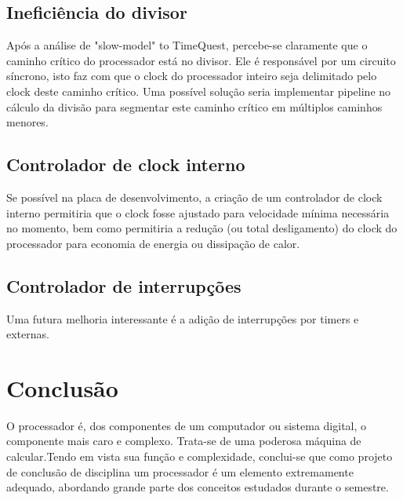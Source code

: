 \documentclass[11pt]{report}
\begin{document}
\section*{Ineficiência do divisor}
Após a análise de "slow-model" to TimeQuest, percebe-se claramente que o caminho crítico do processador está no divisor. Ele é responsável por um circuito síncrono, isto faz com que o clock do processador inteiro seja delimitado pelo clock deste caminho crítico. Uma possível solução seria implementar pipeline no cálculo da divisão para segmentar este caminho crítico em múltiplos caminhos menores.

\section*{Controlador de clock interno}
Se possível na placa de desenvolvimento, a criação de um controlador de clock interno permitiria que o clock fosse ajustado para velocidade mínima necessária no momento, bem como permitiria a redução (ou total desligamento) do clock do processador para economia de energia ou dissipação de calor.

\section*{Controlador de interrupções}
Uma futura melhoria interessante é a adição de interrupções por timers e externas.

\chapter{Conclusão}

O processador é, dos componentes de um computador ou sistema digital, o componente mais caro e complexo. Trata-se de uma poderosa máquina de calcular.Tendo em vista sua função e complexidade, conclui-se que como projeto de conclusão de disciplina um processador é um elemento extremamente adequado, abordando grande parte dos conceitos estudados durante o semestre.
\end{document}
